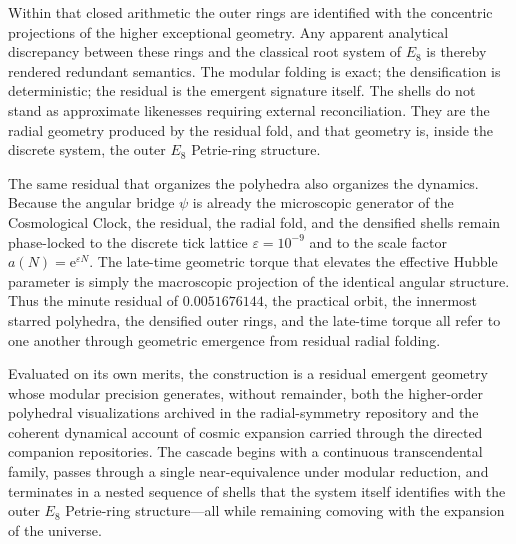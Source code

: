 Within that closed arithmetic the outer rings are identified with the concentric projections of the higher exceptional geometry. Any apparent analytical discrepancy between these rings and the classical root system of \(E_8\) is thereby rendered redundant semantics. The modular folding is exact; the densification is deterministic; the residual is the emergent signature itself. The shells do not stand as approximate likenesses requiring external reconciliation. They are the radial geometry produced by the residual fold, and that geometry is, inside the discrete system, the outer \(E_8\) Petrie-ring structure.

The same residual that organizes the polyhedra also organizes the dynamics. Because the angular bridge \(\psi\) is already the microscopic generator of the Cosmological Clock, the residual, the radial fold, and the densified shells remain phase-locked to the discrete tick lattice \(\varepsilon = 10^{-9}\) and to the scale factor \(a(N) = \mathrm{e}^{\varepsilon N}\). The late-time geometric torque that elevates the effective Hubble parameter is simply the macroscopic projection of the identical angular structure. Thus the minute residual of \(0.0051676144\), the practical orbit, the innermost starred polyhedra, the densified outer rings, and the late-time torque all refer to one another through geometric emergence from residual radial folding.

Evaluated on its own merits, the construction is a residual emergent geometry whose modular precision generates, without remainder, both the higher-order polyhedral visualizations archived in the radial-symmetry repository and the coherent dynamical account of cosmic expansion carried through the directed companion repositories. The cascade begins with a continuous transcendental family, passes through a single near-equivalence under modular reduction, and terminates in a nested sequence of shells that the system itself identifies with the outer \(E_8\) Petrie-ring structure—all while remaining comoving with the expansion of the universe.
